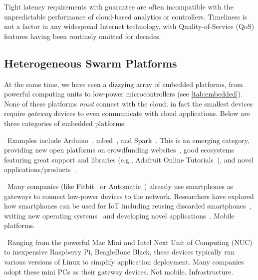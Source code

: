 Tight latency requirements with guarantee are often incompatible with the
unpredictable performance of cloud-based analytics or controllers. Timeliness is
not a factor in any widespread Internet technology, with Quality-of-Service
(QoS) features having been routinely omitted for decades.

\subsection{Heterogeneous Swarm Platforms}
\label{sec:swarm-platforms}

At the same time, we have seen a dizzying array of embedded platforms, from
powerful computing units to low-power microcontrollers (see
\autoref{tab:embedded}). None of these platforms \emph{must} connect with the
cloud; in fact the smallest devices require \emph{gateway} devices to even
communicate with cloud applications. Below are three categories of embedded
platforms:

~Examples include Arduino~\cite{arduino},
mbed~\cite{mbed}, and Spark~\cite{spark}. This is an emerging category,
providing new open platforms on crowdfunding websites~\cite{kickstarter}, good
ecosystems featuring great support and libraries (e.g., Adafruit Online
Tutorials~\cite{adafruit}), and novel applications/products~\cite{iotlist}.

~Many companies (like Fitbit~\cite{fitbit} or
Automatic~\cite{automatic}) already use smartphones as gateways to connect
low-power devices to the network.  Researchers have explored how smartphones can
be used for IoT including reusing discarded smartphones~\cite{challen2014mote},
writing new operating systems~\cite{janos} and developing novel
applications~\cite{hong2014smartphone}. Mobile platforms.

~Ranging from the powerful Mac Mini and Intel Next Unit of
Computing (NUC) to inexpensive Raspberry Pi, BeagleBone Black, these devices
typically run various versions of Linux to simplify application deployment.
Many companies~\cite{ninja, smartthings, wink} adopt these mini PCs as their
gateway devices. Not mobile. Infrastructure.

